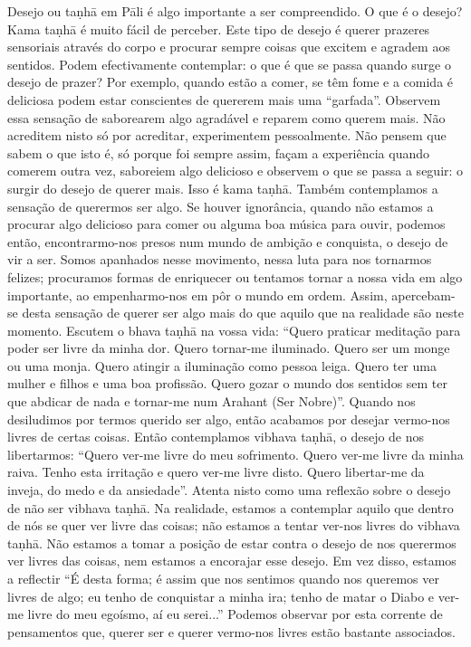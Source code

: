 Desejo ou taṇhā em Pāli é algo importante a ser compreendido. O que é o desejo? Kama taṇhā é muito fácil de
perceber. Este tipo de desejo é querer prazeres sensoriais
através do corpo e procurar sempre coisas que excitem e agradem aos sentidos. Podem efectivamente contemplar: o que é
que se passa quando surge o desejo de prazer? Por exemplo,
quando estão a comer, se têm fome e a comida é deliciosa
podem estar conscientes de quererem mais uma “garfada”.
Observem essa sensação de saborearem algo agradável e
reparem como querem mais. Não acreditem nisto só por
acreditar, experimentem pessoalmente. Não pensem que
sabem o que isto é, só porque foi sempre assim, façam a
experiência quando comerem outra vez, saboreiem algo delicioso e observem o que se passa a seguir: o surgir do desejo
de querer mais. Isso é kama taṇhā.
Também contemplamos a sensação de querermos ser
algo. Se houver ignorância, quando não estamos a procurar
algo delicioso para comer ou alguma boa música para ouvir,
podemos então, encontrarmo-nos presos num mundo de
ambição e conquista, o desejo de vir a ser. Somos apanhados
nesse movimento, nessa luta para nos tornarmos felizes;
procuramos formas de enriquecer ou tentamos tornar a nossa
vida em algo importante, ao empenharmo-nos em pôr o
mundo em ordem. Assim, apercebam-se desta sensação de
querer ser algo mais do que aquilo que na realidade são neste
momento.
Escutem o bhava taṇhā na vossa vida: “Quero praticar
meditação para poder ser livre da minha dor. Quero tornar-me
iluminado. Quero ser um monge ou uma monja. Quero atingir
a iluminação como pessoa leiga. Quero ter uma mulher e filhos
e uma boa profissão. Quero gozar o mundo dos sentidos sem
ter que abdicar de nada e tornar-me num Arahant (Ser
Nobre)”.
Quando nos desiludimos por termos querido ser algo,
então acabamos por desejar vermo-nos livres de certas coisas.
Então contemplamos vibhava taṇhā, o desejo de nos libertarmos: “Quero ver-me livre do meu sofrimento. Quero ver-me
livre da minha raiva. Tenho esta irritação e quero ver-me livre
disto. Quero libertar-me da inveja, do medo e da ansiedade”.
Atenta nisto como uma reflexão sobre o desejo de não ser vibhava taṇhā. Na realidade, estamos a contemplar aquilo que
dentro de nós se quer ver livre das coisas; não estamos a tentar
ver-nos livres do vibhava taṇhā. Não estamos a tomar a
posição de estar contra o desejo de nos querermos ver livres
das coisas, nem estamos a encorajar esse desejo. Em vez
disso, estamos a reflectir “É desta forma; é assim que nos
sentimos quando nos queremos ver livres de algo; eu tenho de
conquistar a minha ira; tenho de matar o Diabo e ver-me livre
do meu egoísmo, aí eu serei...” Podemos observar por esta
corrente de pensamentos que, querer ser e querer vermo-nos
livres estão bastante associados.

